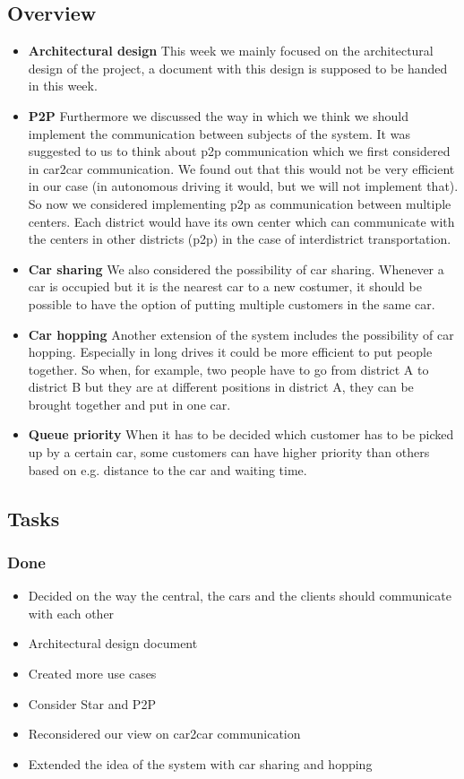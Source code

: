\documentclass[a4paper]{article}
\begin{document}
\subsection*{Overview}
\begin{itemize}
	\item \textbf{Architectural design} This week we mainly focused on the architectural design of the project, a document with this design is supposed to be handed in this week.
	\item \textbf{P2P}  Furthermore we discussed the way in which we think we should implement the communication between subjects of the system. It was suggested to us to think about p2p communication which we first considered in car2car communication. We found out that this would not be very efficient in our case (in autonomous driving it would, but we will not implement that). So now we considered implementing p2p as communication between multiple centers. Each district would have its own center which can communicate with the centers in other districts (p2p) in the case of interdistrict transportation.  
	\item \textbf{Car sharing} We also considered the possibility of car sharing. Whenever a car is occupied but it is the nearest car to a new costumer, it should be possible to have the option of putting multiple customers in the same car. 
	\item \textbf{Car hopping} Another extension of the system includes the possibility of car hopping. Especially in long drives it could be more efficient to put people together. So when, for example, two people have to go from district A to district B but they are at different positions in district A, they can be brought together and put in one car.
	\item \textbf{Queue priority} When it has to be decided which customer has to be picked up by a certain car, some customers can have higher priority than others based on e.g. distance to the car and waiting time. 
	
\end{itemize}


\subsection*{Tasks}
\subsubsection*{Done}
\begin{itemize}
    \item Decided on the way the central, the cars and the clients should communicate with each other
    \item Architectural design document
    \item Created more use cases
    \item Consider Star and P2P
    \item Reconsidered our view on car2car communication
    \item Extended the idea of the system with car sharing and hopping
\end{itemize}
\end{document}

